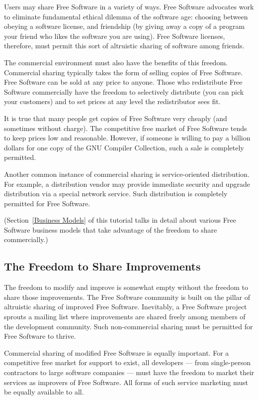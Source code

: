 \documentclass[12pt]{report}
\begin{document}
Users may share Free Software in a variety of ways.  Free Software
advocates work to eliminate fundamental ethical dilemma of the software
age: choosing between obeying a software license, and friendship (by
giving away a copy of a program your friend who likes the software you are
using).  Free Software licenses, therefore, must permit this sort of
altruistic sharing of software among friends.

The commercial environment must also have the benefits of this freedom.
Commercial sharing typically takes the form of selling copies of Free
Software.  Free Software can be sold at any price to anyone.  Those who
redistribute Free Software commercially have the freedom to selectively
distribute (you can pick your customers) and to set prices at any level
the redistributor sees fit.

It is true that many people get copies of Free Software very cheaply (and
sometimes without charge). The competitive free market of Free Software
tends to keep prices low and reasonable.  However, if someone is willing
to pay a billion dollars for one copy of the GNU Compiler Collection, such
a sale is completely permitted.

Another common instance of commercial sharing is service-oriented
distribution.  For example, a distribution vendor may provide immediate
security and upgrade distribution via a special network service.  Such
distribution is completely permitted for Free Software.

(Section~\ref{Business Models} of this tutorial talks in detail about
various Free Software business models that take advantage of the freedom
to share commercially.)

\subsection{The Freedom to Share Improvements}

The freedom to modify and improve is somewhat empty without the freedom to
share those improvements.  The Free Software community is built on the
pillar of altruistic sharing of improved Free Software.  Inevitably, a
Free Software project sprouts a mailing list where improvements are shared
freely among members of the development community.  Such non-commercial
sharing must be permitted for Free Software to thrive.

Commercial sharing of modified Free Software is equally important.  For a
competitive free market for support to exist, all developers --- from
single-person contractors to large software companies --- must have the
freedom to market their services as improvers of Free Software.  All forms
of such service marketing must be equally available to all.
\end{document}
